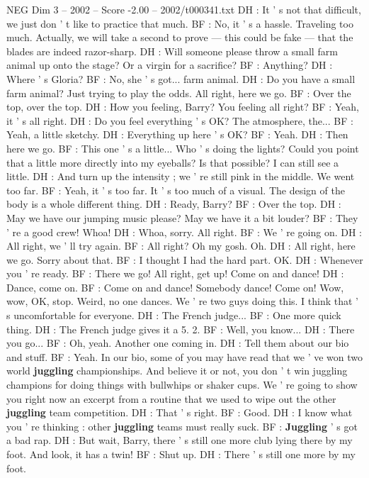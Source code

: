 \begin{textsample}{NEG Dim 3 – 2002 – Score -2.00 – 2002/t000341.txt}
DH : It ' s not that difficult, we just don ' t like to practice that much.
BF : No, it ' s a hassle.
Traveling too much.
Actually, we will take a second to prove — this could be fake — that the blades are indeed razor-sharp.
DH : Will someone please throw a small farm animal up onto the stage?
Or a virgin for a sacrifice?
BF : Anything?
DH : Where ' s Gloria?
BF : No, she ' s got... farm animal.
DH : Do you have a small farm animal?
Just trying to play the odds.
All right, here we go.
BF : Over the top, over the top.
DH : How you feeling, Barry?
You feeling all right?
BF : Yeah, it ' s all right.
DH : Do you feel everything ' s OK?
The atmosphere, the...
BF : Yeah, a little sketchy.
DH : Everything up here ' s OK?
BF : Yeah.
DH : Then here we go.
BF : This one ' s a little...
Who ' s doing the lights?
Could you point that a little more directly into my eyeballs?
Is that possible?
I can still see a little.
DH : And turn up the intensity ; we ' re still pink in the middle.
We went too far.
BF : Yeah, it ' s too far.
It ' s too much of a visual.
The design of the body is a whole different thing.
DH : Ready, Barry?
BF : Over the top.
DH : May we have our jumping music please?
May we have it a bit louder?
BF : They ' re a good crew!
Whoa!
DH : Whoa, sorry.
All right.
BF : We ' re going on.
DH : All right, we ' ll try again.
BF : All right?
Oh my gosh.
Oh.
DH : All right, here we go.
Sorry about that.
BF : I thought I had the hard part.
OK.
DH : Whenever you ' re ready.
BF : There we go!
All right, get up!
Come on and dance!
DH : Dance, come on.
BF : Come on and dance!
Somebody dance!
Come on!
Wow, wow, OK, stop.
Weird, no one dances.
We ' re two guys doing this.
I think that ' s uncomfortable for everyone.
DH : The French judge...
BF : One more quick thing.
DH : The French judge gives it a 5. 2.
BF : Well, you know...
DH : There you go...
BF : Oh, yeah.
Another one coming in.
DH : Tell them about our bio and stuff.
BF : Yeah.
In our bio, some of you may have read that we ' ve won two world \textbf{juggling} championships.
And believe it or not, you don ' t win juggling champions for doing things with bullwhips or shaker cups.
We ' re going to show you right now an excerpt from a routine that we used to wipe out the other \textbf{juggling} team competition.
DH : That ' s right.
BF : Good.
DH : I know what you ' re thinking : other \textbf{juggling} teams must really suck.
BF : \textbf{Juggling} ' s got a bad rap.
DH : But wait, Barry, there ' s still one more club lying there by my foot.
And look, it has a twin!
BF : Shut up.
DH : There ' s still one more by my foot.

\end{textsample}
